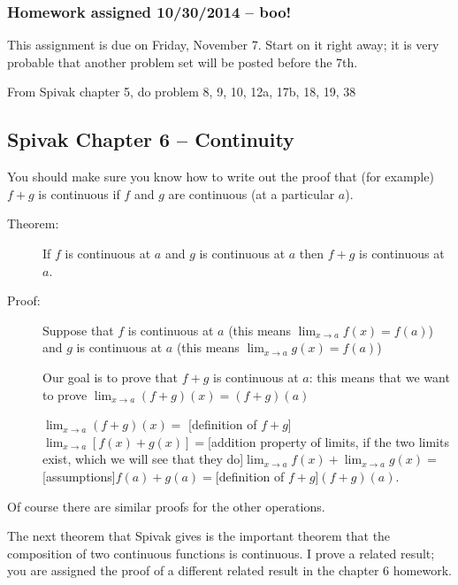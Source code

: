 \documentclass[12pt]{article}
\begin{document}
\subsubsection{Homework assigned 10/30/2014 -- boo!}

This assignment is due on Friday, November 7.  Start on it right away; it is very probable that another problem set will be posted before the 7th.

From Spivak chapter 5, do problem 8, 9, 10, 12a, 17b, 18, 19, 38

\subsection{Spivak Chapter 6 -- Continuity}

You should make sure you know how to write out the proof that (for example) $f+g$ is continuous if $f$ and $g$ are continuous (at a particular $a$).

\begin{description}

\item[Theorem:]  If $f$ is continuous at $a$ and $g$ is continuous at $a$ then $f+g$ is continuous at $a$.

\item[Proof:]  Suppose that $f$ is continuous at $a$ (this means $\lim_{x \rightarrow a}f(x)=f(a)$) and $g$ is continuous at $a$ (this means $\lim_{x \rightarrow a}g(x)=f(a)$)

Our goal is to prove that $f+g$ is continuous at $a$:  this means that we want to prove $\lim_{x \rightarrow a}(f+g)(x)=(f+g)(a)$

$\lim_{x \rightarrow a}(f+g)(x) =$ [definition of $f+g$]\newline$\lim_{x \rightarrow a}[f(x)+g(x)]=$[addition property of limits, if the two limits exist, which we will see that they do]\newline$\lim_{x \rightarrow a}f(x)+\lim_{x \rightarrow a}g(x)=$[assumptions]\newline$f(a)+g(a)=$[definition of $f+g$]\newline$(f+g)(a)$.

\end{description}

Of course there are similar proofs for the other operations.

The next theorem that Spivak gives is the important theorem that the composition of two continuous functions is continuous.  I prove a related result; you are assigned the proof of a different related result in the
chapter 6 homework.
\end{document}
